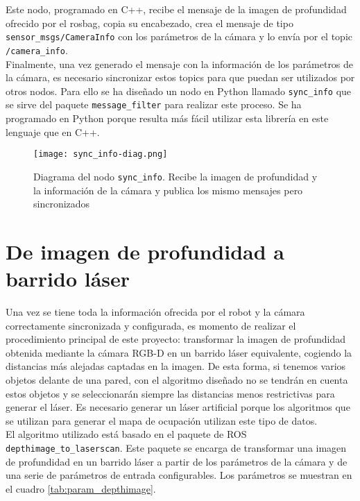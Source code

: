 Este nodo, programado en C++, recibe el mensaje de la imagen de profundidad ofrecido por el rosbag, copia su encabezado, crea el mensaje de tipo \texttt{sensor\_msgs/\-CameraInfo} con los parámetros de la cámara y lo envía por el topic \texttt{/camera\_info}.\\

Finalmente, una vez generado el mensaje con la información de los parámetros de la cámara, es necesario sincronizar estos topics para que puedan ser utilizados por otros nodos. Para ello se ha diseñado un nodo en Python llamado \texttt{sync\_info} que se sirve del paquete \texttt{message\_filter} para realizar este proceso. Se ha programado en Python porque resulta más fácil utilizar esta librería en este lenguaje que en C++.\\

\begin{figure}[h]
	\begin{center} 
		\texttt{[image: sync\_info-diag.png]}
	\end{center}
	\caption{Diagrama del nodo \texttt{sync\_info}. Recibe la imagen de profundidad y la información de la cámara y publica los mismo mensajes pero sincronizados}
	\label{fig:sync_info}
\end{figure}

\section{De imagen de profundidad a barrido láser} \label{depthimage_section}

Una vez se tiene toda la información ofrecida por el robot y la cámara correctamente sincronizada y configurada, es momento de realizar el procedimiento principal de este proyecto: transformar la imagen de profundidad obtenida mediante la cámara RGB-D en un barrido láser equivalente, cogiendo la distancias más alejadas captadas en la imagen. De esta forma, si tenemos varios objetos delante de una pared, con el algoritmo diseñado no se tendrán en cuenta estos objetos y se seleccionarán siempre las distancias menos restrictivas para generar el láser. Es necesario generar un láser artificial porque los algoritmos que se utilizan para generar el mapa de ocupación utilizan este tipo de datos.\\

El algoritmo utilizado está basado en el paquete de ROS \texttt{depthimage\-\_to\_\-laserscan}. Este paquete se encarga de transformar una imagen de profundidad en un barrido láser a partir de los parámetros de la cámara y de una serie de parámetros de entrada configurables. Los parámetros se muestran en el cuadro \ref{tab:param_depthimage}.

